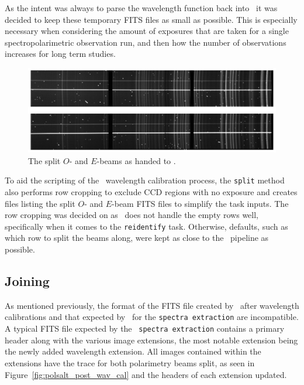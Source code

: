 As the intent was always to parse the wavelength function back into \polsalt\ it was decided to keep these temporary \gls{FITS} files as small as possible. This is especially necessary when considering the amount of exposures that are taken for a single spectropolarimetric observation run, and then how the number of observations increases for long term studies.

\begin{figure}[t]
    \centering
    \includegraphics[width = 1.0\textwidth]{figures/3_OEsplit.pdf}
    \caption{The split $O$- and $E$-beams as handed to \iraf.}
    \label{fig:OE_split}
\end{figure}

To aid the scripting of the \iraf\ wavelength calibration process, the \texttt{split} method also performs row cropping to exclude \gls{CCD} regions with no exposure and creates files listing the split $O$- and $E$-beam \gls{FITS} files to simplify the task inputs. The row cropping was decided on as \iraf\ does not handle the empty rows well, specifically when it comes to the \texttt{reidentify} task. Otherwise, defaults, such as which row to split the beams along, were kept as close to the \polsalt\ pipeline as possible.

\subsection{Joining}



As mentioned previously, the format of the \gls{FITS} file created by \iraf\ after wavelength calibrations and that expected by \polsalt\ for the \texttt{spectra extraction} are incompatible. A typical \gls{FITS} file expected by the \polsalt\ \texttt{spectra extraction} contains a primary header along with the various image extensions, the most notable extension being the newly added wavelength extension. All images contained within the extensions have the trace for both polarimetry beams split, as seen in Figure~\ref{fig:polsalt_post_wav_cal} and the headers of each extension updated.

